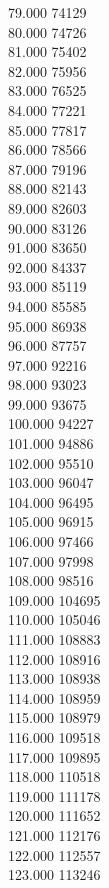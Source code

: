 { 79.000	74129 \\
 80.000	74726 \\
 81.000	75402 \\
 82.000	75956 \\
 83.000	76525 \\
 84.000	77221 \\
 85.000	77817 \\
 86.000	78566 \\
 87.000	79196 \\
 88.000	82143 \\
 89.000	82603 \\
 90.000	83126 \\
 91.000	83650 \\
 92.000	84337 \\
 93.000	85119 \\
 94.000	85585 \\
 95.000	86938 \\
 96.000	87757 \\
 97.000	92216 \\
 98.000	93023 \\
 99.000	93675 \\
 100.000	94227 \\
 101.000	94886 \\
 102.000	95510 \\
 103.000	96047 \\
 104.000	96495 \\
 105.000	96915 \\
 106.000	97466 \\
 107.000	97998 \\
 108.000	98516 \\
 109.000	104695 \\
 110.000	105046 \\
 111.000	108883 \\
 112.000	108916 \\
 113.000	108938 \\
 114.000	108959 \\
 115.000	108979 \\
 116.000	109518 \\
 117.000	109895 \\
 118.000	110518 \\
 119.000	111178 \\
 120.000	111652 \\
 121.000	112176 \\
 122.000	112557 \\
 123.000	113246 \\
}
